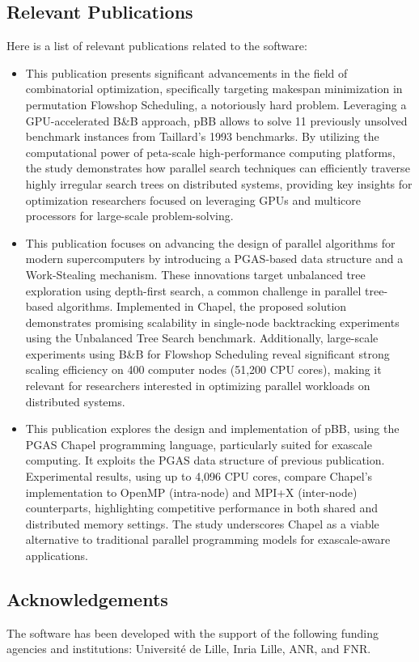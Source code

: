 \subsection{Relevant Publications}
\label{sec:pBB:publications}

Here is a list of relevant publications related to the software:

\begin{itemize}
    \item {} This publication presents significant advancements in the field of combinatorial optimization, specifically targeting makespan minimization in permutation Flowshop Scheduling, a notoriously hard problem. Leveraging a GPU-accelerated B\&B approach, pBB allows to solve 11 previously unsolved benchmark instances from Taillard's 1993 benchmarks. By utilizing the computational power of peta-scale high-performance computing platforms, the study demonstrates how parallel search techniques can efficiently traverse highly irregular search trees on distributed systems, providing key insights for optimization researchers focused on leveraging GPUs and multicore processors for large-scale problem-solving.

    \item {} This publication focuses on advancing the design of parallel algorithms for modern supercomputers by introducing a PGAS-based data structure and a Work-Stealing mechanism. These innovations target unbalanced tree exploration using depth-first search, a common challenge in parallel tree-based algorithms. Implemented in Chapel, the proposed solution demonstrates promising scalability in single-node backtracking experiments using the Unbalanced Tree Search benchmark. Additionally, large-scale experiments using B\&B for Flowshop Scheduling reveal significant strong scaling efficiency on 400 computer nodes (51,200 CPU cores), making it relevant for researchers interested in optimizing parallel workloads on distributed systems.

    \item {} This publication explores the design and implementation of pBB, using the PGAS Chapel programming language, particularly suited for exascale computing. It exploits the PGAS data structure of previous publication. Experimental results, using up to 4,096 CPU cores, compare Chapel's implementation to OpenMP (intra-node) and MPI+X (inter-node) counterparts, highlighting competitive performance in both shared and distributed memory settings. The study underscores Chapel as a viable alternative to traditional parallel programming models for exascale-aware applications.
\end{itemize}

\subsection{Acknowledgements}
\label{sec::pBB:acknowledgements}

The software has been developed with the support of the following funding agencies and institutions: Université de Lille, Inria Lille, ANR, and FNR.